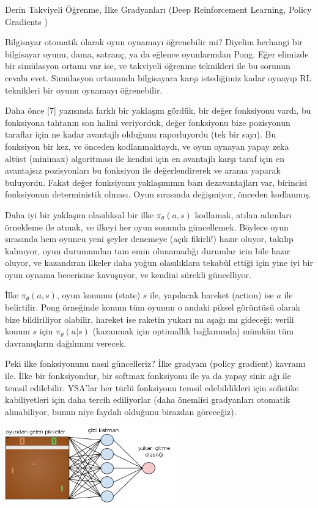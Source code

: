 \documentclass[12pt,fleqn]{article}\usepackage{../../common}
\begin{document}
Derin Takviyeli Öğrenme, İlke Gradyanları (Deep Reinforcement Learning, Policy Gradients )

Bilgisayar otomatik olarak oyun oynamayı öğrenebilir mi? Diyelim herhangi
bir bilgisayar oyunu, dama, satranç, ya da eğlence oyunlarından Pong. Eğer
elimizde bir simülasyon ortamı var ise, ve takviyeli öğrenme teknikleri ile
bu sorunun cevabı evet. Simülasyon ortamında bilgisayara karşı istediğimiz
kadar oynayıp RL teknikleri bir oyunu oynamayı öğrenebilir.

Daha önce [7] yazısında farklı bir yaklaşım gördük, bir değer fonksiyonu
vardı, bu fonksiyona tahtanın son halini veriyorduk, değer fonksiyonu bize
pozisyonun taraflar için ne kadar avantajlı olduğunu raporluyordu (tek bir
sayı). Bu fonksiyon bir kez, ve önceden kodlanmaktaydı, ve oyun oynayan
yapay zeka altüst (minimax) algoritması ile kendisi için en avantajlı karşı
taraf için en avantajsız pozisyonları bu fonksiyon ile değerlendirerek ve
arama yaparak buluyordu. Fakat değer fonksiyonu yaklaşımının bazı
dezavantajları var, birincisi fonksiyonun deterministik olması. Oyun
sırasında değişmiyor, önceden kodlanmış.

Daha iyi bir yaklaşım olasılıksal bir ilke $\pi_\theta(a,s)$ kodlamak,
atılan adımları örnekleme ile atmak, ve ilkeyi her oyun sonunda
güncellemek. Böylece oyun sırasında hem oyuncu yeni şeyler denemeye (açık
fikirli!) hazır oluyor, takılıp kalmıyor, oyun durumundan tam emin
olunamadığı durumlar icin bile hazır oluyor, ve kazandıran ilkeler daha
yoğun olasılıklara tekabül ettiği için yine iyi bir oyun oynama becerisine
kavuşuyor, ve kendini sürekli güncelliyor.

İlke $\pi_\theta(a,s)$, oyun konumu (state) $s$ ile, yapılacak hareket
(action) ise $a$ ile belirtilir. Pong örneğinde konum tüm oyunun o andaki
piksel görüntüsü olarak bize bildiriliyor olabilir, hareket ise raketin
yukarı mı aşağı mı gideceği; verili konum $s$ için $\pi_\theta(a|s)$
(kazanmak için optimallik bağlamında) mümkün tüm davranışların dağılımını
verecek.

Peki ilke fonksiyonunu nasıl güncelleriz? İlke gradyanı (policy gradient)
kavramı ile. İlke bir fonksiyondur, bir softmax fonksiyonu ile ya da yapay
sinir ağı ile temsil edilebilir. YSA'lar her türlü fonksiyonu temsil
edebildikleri için sofistike kabiliyetleri için daha tercih ediliyorlar
(daha önemlisi gradyanları otomatik alınabiliyor, bunun niye faydalı
olduğunu birazdan göreceğiz). 

\includegraphics[width=20em]{policy.png}
\end{document}
